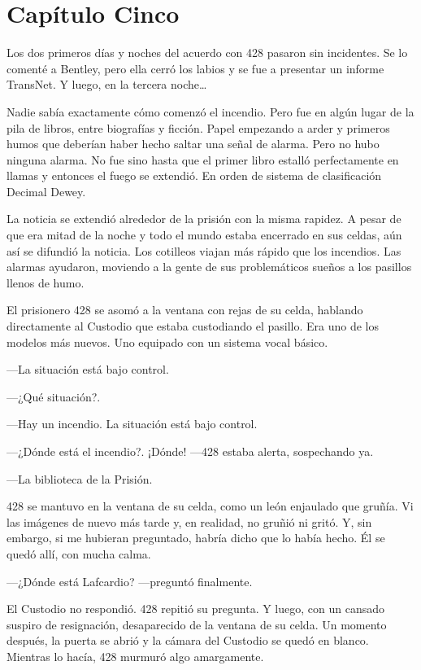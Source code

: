\chapter*{Capítulo Cinco}

Los dos primeros días y noches del acuerdo con 428 pasaron sin
incidentes. Se lo comenté a Bentley, pero ella cerró los labios y se fue
a presentar un informe TransNet. Y luego, en la tercera noche\ldots{}

Nadie sabía exactamente cómo comenzó el incendio. Pero fue en algún
lugar de la pila de libros, entre biografías y ficción. Papel empezando
a arder y primeros humos que deberían haber hecho saltar una señal de
alarma. Pero no hubo ninguna alarma. No fue sino hasta que el primer
libro estalló perfectamente en llamas y entonces el fuego se extendió.
En orden de sistema de clasificación Decimal Dewey.

La noticia se extendió alrededor de la prisión con la misma rapidez. A
pesar de que era mitad de la noche y todo el mundo estaba encerrado en
sus celdas, aún así se difundió la noticia. Los cotilleos viajan más
rápido que los incendios. Las alarmas ayudaron, moviendo a la gente de
sus problemáticos sueños a los pasillos llenos de humo.

El prisionero 428 se asomó a la ventana con rejas de su celda, hablando
directamente al Custodio que estaba custodiando el pasillo. Era uno de
los modelos más nuevos. Uno equipado con un sistema vocal básico.

---La situación está bajo control.

---¿Qué situación?.

---Hay un incendio. La situación está bajo control.

---¿Dónde está el incendio?. ¡Dónde! ---428 estaba alerta, sospechando
ya.

---La biblioteca de la Prisión.

428 se mantuvo en la ventana de su celda, como un león enjaulado que
gruñía. Vi las imágenes de nuevo más tarde y, en realidad, no gruñió ni
gritó. Y, sin embargo, si me hubieran preguntado, habría dicho que lo
había hecho. Él se quedó allí, con mucha calma.

---¿Dónde está Lafcardio? ---preguntó finalmente.

El Custodio no respondió. 428 repitió su pregunta. Y luego, con un
cansado suspiro de resignación, desaparecido de la ventana de su celda.
Un momento después, la puerta se abrió y la cámara del Custodio se quedó
en blanco. Mientras lo hacía, 428 murmuró algo amargamente.

